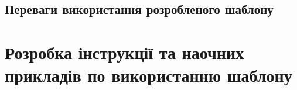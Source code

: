 \subsection{Переваги використання розробленого шаблону}


\section{Розробка інструкції та наочних прикладів по використанню шаблону}



